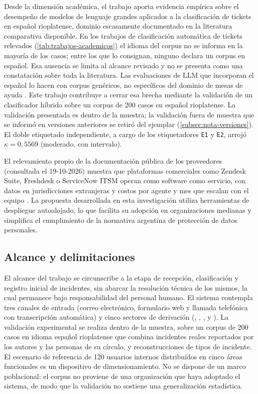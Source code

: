 Desde la dimensión académica, el trabajo aporta evidencia empírica sobre el desempeño de modelos de lenguaje grandes aplicados a la clasificación de tickets en español rioplatense, dominio escasamente documentado en la literatura comparativa disponible. En los trabajos de clasificación automática de tickets relevados (\autoref{tab:trabajos-academicos}) el idioma del corpus no se informa en la mayoría de los casos; entre los que lo consignan, ninguno declara un corpus en español. Esa ausencia se limita al alcance revisado y no se presenta como una constatación sobre toda la literatura. Las evaluaciones de LLM que incorporan el español lo hacen con corpus genéricos, no específicos del dominio de mesas de ayuda \parencite{grandury2025laleaderboard,mayorrocher2026spanish}. Este trabajo contribuye a cerrar esa brecha mediante la validación de un clasificador híbrido sobre un corpus de 200 casos en español rioplatense. La validación presentada es dentro de la muestra; la validación fuera de muestra que se informó en versiones anteriores se retiró del ejemplar (\autoref{subsec:nota-versiones}). El doble etiquetado independiente, a cargo de los etiquetadores \texttt{E1} y \texttt{E2}, arrojó $\kappa = 0{,}5569$ (moderado, con intervalo).

El relevamiento propio de la documentación pública de los proveedores (consultada el 19-10-2026) muestra que plataformas comerciales como Zendesk Suite, Freshdesk o ServiceNow ITSM operan como software como servicio, con datos en jurisdicciones extranjeras y costos por agente y mes que escalan con el equipo \parencite{Zendesk2026_help_desk,Freshdesk2026_platform,ServiceNow2026_itsm}. La propuesta desarrollada en esta investigación utiliza herramientas de despliegue autoalojado, lo que facilita su adopción en organizaciones medianas y simplifica el cumplimiento de la normativa argentina de protección de datos personales.

\subsection{Alcance y delimitaciones}\label{subsec:alcance-delimitaciones}

El alcance del trabajo se circunscribe a la etapa de recepción, clasificación y registro inicial de incidentes, sin abarcar la resolución técnica de los mismos, la cual permanece bajo responsabilidad del personal humano. El sistema contempla tres canales de entrada (correo electrónico, formulario web y llamada telefónica con transcripción automática) y cinco sectores de derivación (, , ,  y ). La validación experimental se realiza dentro de la muestra, sobre un corpus de 200 casos en idioma español rioplatense que combina incidentes reales reportados por los autores y las personas de su círculo, y reconstrucciones de tipos de incidente. El escenario de referencia de 120 usuarios internos distribuidos en cinco áreas funcionales es un dispositivo de dimensionamiento. No se dispone de un marco poblacional: el corpus no proviene de una organización que haya adoptado el sistema, de modo que la validación no sostiene una generalización estadística.

